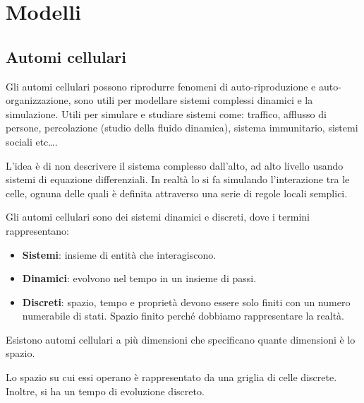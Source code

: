 \chapter{Modelli}
\section{Automi cellulari}
Gli automi cellulari possono riprodurre fenomeni di auto-riproduzione e
auto-organizzazione, sono utili per modellare sistemi complessi dinamici e la
simulazione. Utili per simulare e studiare sistemi come: traffico, afflusso di
persone, percolazione (studio della fluido dinamica), sistema immunitario, sistemi
sociali etc\dots.

L'idea è di non descrivere il sistema complesso dall'alto, ad alto livello usando
sistemi di equazione differenziali. In realtà lo si fa simulando l'interazione
tra le celle, ognuna delle quali è definita attraverso una serie di regole locali
semplici.

Gli automi cellulari sono dei sistemi dinamici e discreti, dove i termini
rappresentano:
\begin{itemize}
    \item \textbf{Sistemi}: insieme di entità che interagiscono.
    \item \textbf{Dinamici}: evolvono nel tempo in un insieme di passi.
    \item \textbf{Discreti}: spazio, tempo e proprietà devono essere solo finiti
          con un numero numerabile di stati. Spazio finito perché dobbiamo
          rappresentare la realtà.
\end{itemize}
Esistono automi cellulari a più dimensioni che specificano quante dimensioni è lo
spazio.

Lo spazio su cui essi operano è rappresentato da una griglia di celle discrete.
Inoltre, si ha un tempo di evoluzione discreto.

